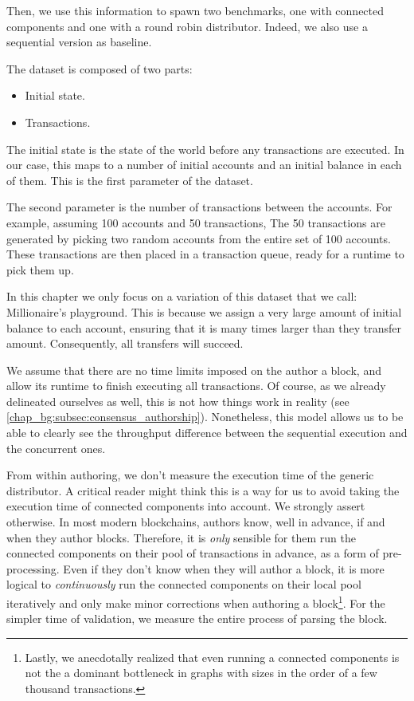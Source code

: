 Then, we use this information to spawn two benchmarks, one with connected components and one with a
round robin distributor. Indeed, we also use a sequential version as baseline.

The dataset is composed of two parts:

\begin{itemize}
	\item Initial state.
	\item Transactions.
\end{itemize}

The initial state is the state of the world before any transactions are executed. In our case, this
maps to a number of initial accounts and an initial balance in each of them. This is the first
parameter of the dataset.

The second parameter is the number of transactions between the accounts. For example, assuming 100
accounts and 50 transactions, The 50 transactions are generated by picking two random accounts from
the entire set of 100 accounts. These transactions are then placed in a transaction queue, ready for
a runtime to pick them up.

In this chapter we only focus on a variation of this dataset that we call: Millionaire's playground.
This is because we assign a very large amount of initial balance to each account, ensuring that it
is many times larger than they transfer amount. Consequently, all transfers will succeed.

We assume that there are no time limits imposed on the author a block, and allow its runtime to
finish executing all transactions. Of course, as we already delineated ourselves as well, this is
not how things work in reality (see \ref{chap_bg:subsec:consensus_authorship}). Nonetheless, this
model allows us to be able to clearly see the throughput difference between the sequential execution
and the concurrent ones.

From within authoring, we don't measure the execution time of the generic distributor. A critical
reader might think this is a way for us to avoid taking the execution time of connected components
into account. We strongly assert otherwise. In most modern blockchains, authors know, well in
advance, if and when they author blocks. Therefore, it is \textit{only} sensible for them run
the connected components on their pool of transactions in advance, as a form of pre-processing. Even
if they don't know when they will author a block, it is more logical to \textit{continuously} run
the connected components on their local pool iteratively and only make minor corrections when
authoring a block\footnote{Lastly, we anecdotally realized that even running a connected components
is not the a dominant bottleneck in graphs with sizes in the order of a few thousand transactions.}.
For the simpler time of validation, we measure the entire process of parsing the block.

